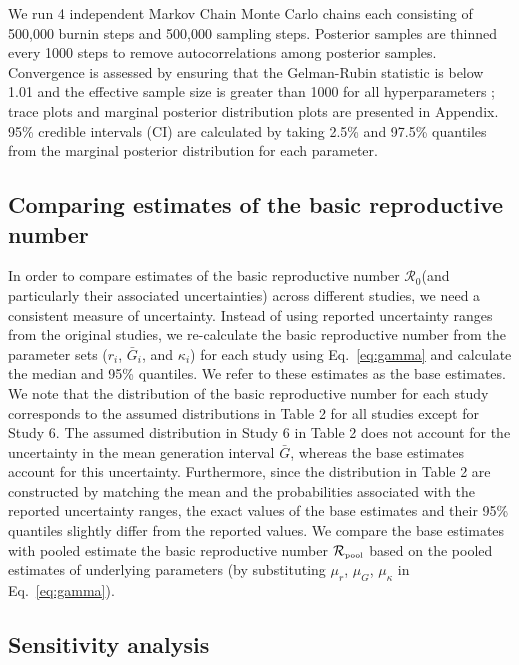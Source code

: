 \documentclass[12pt]{article}
\newcommand{\eref}[1]{Eq.~\ref{eq:#1}}
\newcommand{\Ro}{\ensuremath{{\mathcal R}_{0}}\xspace}
\newcommand{\Rpool}{\ensuremath{{\mathcal R}_{\textrm{\tiny{pool}}}}\xspace}
\begin{document}
We run 4 independent Markov Chain Monte Carlo chains each consisting of 500,000 burnin steps and 500,000 sampling steps.
Posterior samples are thinned every 1000 steps to remove autocorrelations among posterior samples.
Convergence is assessed by ensuring that the Gelman-Rubin statistic is below 1.01 and the effective sample size is greater than 1000 for all hyperparameters \citep{gelman1992inference};
trace plots and marginal posterior distribution plots are presented in Appendix.
95\% credible intervals (CI) are calculated by taking 2.5\% and 97.5\% quantiles from the marginal posterior distribution for each parameter.

\subsection{Comparing estimates of the basic reproductive number}

In order to compare estimates of the basic reproductive number \Ro (and particularly their associated uncertainties) across different studies, we need a consistent measure of uncertainty.
Instead of using reported uncertainty ranges from the original studies, we re-calculate the basic reproductive number from the parameter sets ($r_i$, $\bar G_i$, and $\kappa_i$) for each study using \eref{gamma} and calculate the median and 95\% quantiles.
We refer to these estimates as the base estimates.
We note that the distribution of the basic reproductive number for each study corresponds to the assumed distributions in Table 2 for all studies except for Study 6.
The assumed distribution in Study 6 in Table 2 does not account for the uncertainty in the mean generation interval $\bar G$, whereas the base estimates account for this uncertainty.
Furthermore, since the distribution in Table 2 are constructed by matching the mean and the probabilities associated with the reported uncertainty ranges, the exact values of the base estimates and their 95\% quantiles slightly differ from the reported values.
We compare the base estimates with pooled estimate the basic reproductive number \Rpool based on the pooled estimates of underlying parameters (by substituting $\mu_r$, $\mu_G$, $\mu_\kappa$ in \eref{gamma}). 

\subsection{Sensitivity analysis}
\end{document}

